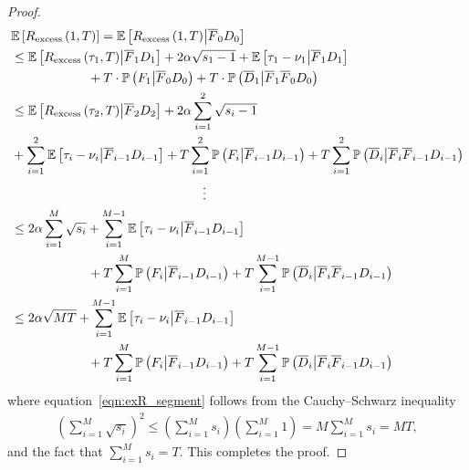 \documentclass[twoside]{article}
\def\eqref#1{equation~\ref{#1}}
\newcommand{\E}{\mathbb{E}}
\theoremstyle{plain}
\theoremstyle{definition}
\theoremstyle{remark}
\begin{document}
\begin{proof}
    \begin{subequations}
        \begin{align}
            &\E\left[R_{\mathrm{excess}}\left(1,T\right)\right] =\E\left[R_{\mathrm{excess}}\left(1,T\right)\middle|\overline{F}_{0}D_{0}\right] \\
            & \leq \E\left[R_{\mathrm{excess}}\left(\tau_{1},T\right)\middle|\overline{F}_{1}D_{1}\right]+2\alpha\sqrt{s_{1}-1}+\E\left[\tau_{1}-\nu_{1}\middle| \overline{F}_{1}D_{1}\right]\\
            &\hspace{+60pt}+T\cdot\mathbb{P}\left(F_{1}\middle| \overline{F}_{0}D_{0}\right)+T\cdot\mathbb{P}\left(\overline{D}_{1}\middle| \overline{F}_{1}\overline{F}_{0}D_{0}\right) \\
            & \leq \E\left[R_{\mathrm{excess}}\left(\tau_{2},T\right)\middle|\overline{F}_{2}D_{2}\right]+2\alpha\sum^{2}_{i=1}\sqrt{s_{i}-1}\\ 
            &+\sum^{2}_{i=1}\E\left[\tau_{i}-\nu_{i}\middle| \overline{F}_{i-1}D_{i-1}\right]+T\sum^{2}_{i=1}\mathbb{P}\left(F_{i}\middle| \overline{F}_{i-1}D_{i-1}\right)+T\sum^{2}_{i=1}\mathbb{P}\left(\overline{D}_{i}\middle| \overline{F}_{i}\overline{F}_{i-1}D_{i-1}\right) \\
            &\hspace{+150pt}\vdots\nonumber\\
            & \leq 2\alpha\sum^{M}_{i=1}\sqrt{s_{i}}+\sum^{M-1}_{i=1}\E\left[\tau_{i}-\nu_{i}\middle| \overline{F}_{i-1}D_{i-1}\right]\\
            &\hspace{+60pt}+T\sum^{M}_{i=1}\mathbb{P}\left(F_{i}\middle| \overline{F}_{i-1}D_{i-1}\right)+T\sum^{M-1}_{i=1}\mathbb{P}\left(\overline{D}_{i}\middle| \overline{F}_{i}\overline{F}_{i-1}D_{i-1}\right)\\
            & \leq 2\alpha\sqrt{MT}+\sum^{M-1}_{i=1}\E\left[\tau_{i}-\nu_{i}\middle| \overline{F}_{i-1}D_{i-1}\right]\label{eqn:exR_segment}\\
            &\hspace{+60pt}+T\sum^{M}_{i=1}\mathbb{P}\left(F_{i}\middle| \overline{F}_{i-1}D_{i-1}\right)+T\sum^{M-1}_{i=1}\mathbb{P}\left(\overline{D}_{i}\middle| \overline{F}_{i}\overline{F}_{i-1}D_{i-1}\right)
        \end{align}
    \end{subequations}
    where \eqref{eqn:exR_segment} follows from the Cauchy–Schwarz inequality
    \begin{subequations}
        \begin{align}
            \left(\sum^{M}_{i=1}\sqrt{s_{i}}\right)^{2}\leq \left(\sum^{M}_{i=1}s_{i}\right)\left(\sum^{M}_{i=1}1\right)= M\sum^{M}_{i=1}s_{i}= MT,
        \end{align}
    \end{subequations}
    and the fact that $\sum^{M}_{i=1}s_{i}=T$. This completes the proof.
\end{proof}
\end{document}
